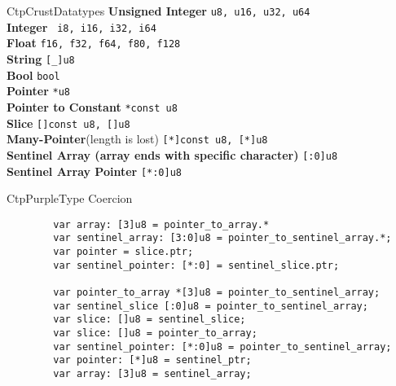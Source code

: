 \documentclass[10pt,a4paper]{article}
\begin{document}
\begin{multicols*}{3}
\begin{mycolorbox}{CtpCrust}{Datatypes}
			\textbf{Unsigned Integer} \texttt{u8, u16, u32, u64}\\
			\textbf{Integer} \texttt{ i8, i16, i32, i64}\\
			\textbf{Float} \texttt{f16, f32, f64, f80, f128}\\
			\textbf{String} \texttt{[_]u8}\\
			\textbf{Bool} \texttt{bool}\\
			\textbf{Pointer} \texttt{*u8}\\
			\textbf{Pointer to Constant} \texttt{*const u8} \\
			\textbf{Slice} \texttt{[]const u8, []u8}\\
			\textbf{Many-Pointer}(length is lost) \texttt{[*]const u8, [*]u8}\\
			\textbf{Sentinel Array (array ends with specific character)} \texttt{[:0]u8}\\
			\textbf{Sentinel Array Pointer} \texttt{[*:0]u8}\\
\end{mycolorbox}


\begin{mycolorbox}{CtpPurple}{Type Coercion}
	\begin{verbatim}
		var array: [3]u8 = pointer_to_array.*
		var sentinel_array: [3:0]u8 = pointer_to_sentinel_array.*;
		var pointer = slice.ptr;
		var sentinel_pointer: [*:0] = sentinel_slice.ptr;
		
		var pointer_to_array *[3]u8 = pointer_to_sentinel_array;
		var sentinel_slice [:0]u8 = pointer_to_sentinel_array;
		var slice: []u8 = sentinel_slice;
		var slice: []u8 = pointer_to_array;
		var sentinel_pointer: [*:0]u8 = pointer_to_sentinel_array;
		var pointer: [*]u8 = sentinel_ptr;
		var array: [3]u8 = sentinel_array;
		

\end{verbatim}
\end{mycolorbox}
\end{multicols*}
\end{document}
